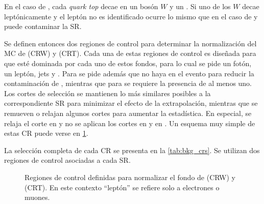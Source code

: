 En el caso de {\ttgam}, cada \emph{quark top} decae en un bosón $W$ y un
{\bjet}. Si uno de los $W$ decae leptónicamente y el leptón no es identificado
ocurre lo mismo que en el caso de {\wgam} y puede contaminar la SR.

Se definen entonces dos regiones de control para determinar la normalización del
MC de {\wgam} (CRW) y {\ttgam} (CRT). Cada una de estas regiones de control es
diseñada para que esté dominada por cada uno de estos fondos, para lo cual se
pide un fotón, un leptón, jets y \met. Para {\CRW} se pide además que no haya
{\bjets} en el evento para reducir la contaminación de {\ttgam}, mientras que
para {\CRT} se requiere la presencia de al menos uno.
Los cortes de selección se mantienen lo
más similares posibles a la correspondiente SR para minimizar el efecto de la
extrapolación, mientras que se remueven o relajan
algunos cortes para aumentar la estadística. En especial, se relaja el corte en
{\met} y no se aplican los cortes en {\HT} y en {\rt}. Un esquema muy simple de
estas CR puede verse en \cref{fig:bkg_crt_crw}.

La selección completa de cada CR se presenta en la \cref{tab:bkg_crs}. Se utilizan
dos regiones de control asociadas a cada SR.

\begin{figure}[!htbp]
  \centering

  \resizebox{0.5\textwidth}{!}{}

  \caption{Regiones de control definidas para normalizar el fondo de
    {\wgam} (CRW) y {\ttgam} (CRT). En este contexto ``leptón'' se
    refiere solo a electrones o muones.}
  \label{fig:bkg_crt_crw}
\end{figure}



